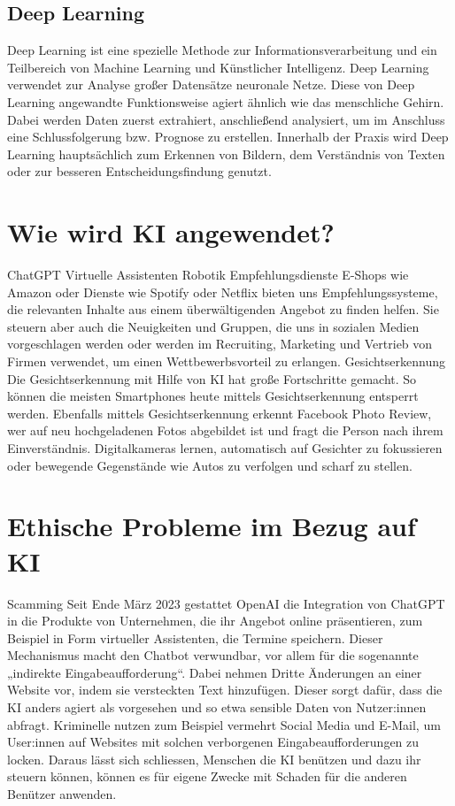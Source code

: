 \documentclass{report}
\begin{document}
 \section{Deep Learning} 
 Deep Learning ist eine spezielle Methode zur Informationsverarbeitung und ein Teilbereich von Machine Learning und Künstlicher 
 Intelligenz. Deep Learning verwendet zur Analyse großer Datensätze neuronale Netze. Diese von Deep Learning angewandte Funktionsweise
  agiert ähnlich wie das menschliche Gehirn. Dabei werden Daten zuerst extrahiert, anschließend analysiert, um im Anschluss eine 
  Schlussfolgerung bzw. Prognose zu erstellen. Innerhalb der Praxis wird Deep Learning hauptsächlich zum Erkennen von Bildern,
   dem Verständnis von Texten oder zur besseren Entscheidungsfindung genutzt. 


   \chapter{Wie wird KI angewendet?}
   ChatGPT
   Virtuelle Assistenten
   Robotik
   Empfehlungsdienste
   E-Shops wie Amazon oder Dienste wie Spotify oder Netflix bieten uns Empfehlungssysteme, die relevanten Inhalte
    aus einem überwältigenden Angebot zu finden helfen. Sie steuern aber auch die Neuigkeiten und Gruppen,
 die uns in sozialen Medien vorgeschlagen werden oder werden im Recruiting, Marketing und Vertrieb von Firmen verwendet, 
 um einen Wettbewerbsvorteil zu erlangen.
 Gesichtserkennung
Die Gesichtserkennung mit Hilfe von KI hat große Fortschritte gemacht. 
So können die meisten Smartphones heute mittels Gesichtserkennung entsperrt werden. 
Ebenfalls mittels Gesichtserkennung erkennt Facebook Photo Review, wer auf neu hochgeladenen 
Fotos abgebildet ist und fragt die Person nach ihrem Einverständnis. Digitalkameras lernen, automatisch
 auf Gesichter zu fokussieren oder bewegende Gegenstände wie Autos zu verfolgen und scharf zu stellen.

 \chapter{Ethische Probleme im Bezug auf KI}

 Scamming
 Seit Ende März 2023 gestattet OpenAI die Integration von ChatGPT in die Produkte von Unternehmen, 
 die ihr Angebot online präsentieren, zum Beispiel in Form virtueller Assistenten, die Termine speichern. 
 Dieser Mechanismus macht den Chatbot verwundbar, vor allem für die sogenannte „indirekte Eingabeaufforderung“.
 Dabei nehmen Dritte Änderungen an einer Website vor, indem sie versteckten Text hinzufügen. Dieser sorgt dafür,
dass die KI anders agiert als vorgesehen und so etwa sensible Daten von Nutzer:innen abfragt. Kriminelle nutzen 
zum Beispiel vermehrt Social Media und E-Mail, um User:innen auf Websites mit solchen verborgenen Eingabeaufforderungen zu locken.
Daraus lässt sich schliessen, Menschen die KI benützen und dazu ihr steuern können, können es für eigene Zwecke mit Schaden 
für die anderen Benützer anwenden. 
\end{document}
